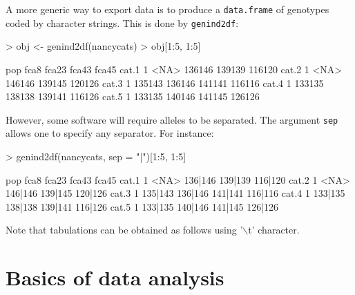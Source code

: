\documentclass{article}
\begin{document}


A more generic way to export data is to produce a \texttt{data.frame} of genotypes
coded by character strings.
This is done by \texttt{genind2df}:
\begin{Schunk}
\begin{Sinput}
> obj <- genind2df(nancycats)
> obj[1:5, 1:5]
\end{Sinput}
\begin{Soutput}
      pop   fca8  fca23  fca43  fca45
cat.1   1   <NA> 136146 139139 116120
cat.2   1   <NA> 146146 139145 120126
cat.3   1 135143 136146 141141 116116
cat.4   1 133135 138138 139141 116126
cat.5   1 133135 140146 141145 126126
\end{Soutput}
\end{Schunk}

\noindent However, some software will require alleles to be
separated.
The argument \texttt{sep} allows one to specify any separator.
For instance:
\begin{Schunk}
\begin{Sinput}
> genind2df(nancycats, sep = "|")[1:5, 1:5]
\end{Sinput}
\begin{Soutput}
      pop    fca8   fca23   fca43   fca45
cat.1   1    <NA> 136|146 139|139 116|120
cat.2   1    <NA> 146|146 139|145 120|126
cat.3   1 135|143 136|146 141|141 116|116
cat.4   1 133|135 138|138 139|141 116|126
cat.5   1 133|135 140|146 141|145 126|126
\end{Soutput}
\end{Schunk}

Note that tabulations can be obtained as follows using '{$\backslash$}t' character.






\newpage
\section{Basics of data analysis}

\end{document}
